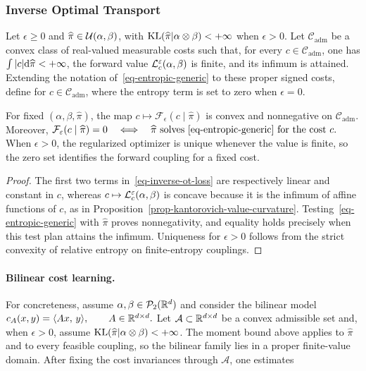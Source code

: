 \subsubsection{Inverse Optimal Transport}
\begin{defn}\label{def-inverse-ot-loss}
Let $\epsilon\geq0$ and $\widehat\pi\in\Couplings(\alpha,\beta)$, with $\KL(\widehat\pi|\alpha\otimes\beta)<+\infty$ when $\epsilon>0$. Let $\mathcal C_{\mathrm{adm}}$ be a convex class of real-valued measurable costs such that, for every $c\in\mathcal C_{\mathrm{adm}}$, one has $\int|c|\d\widehat\pi<+\infty$, the forward value $\MK_c^\epsilon(\alpha,\beta)$ is finite, and its infimum is attained. Extending the notation of~\eqref{eq-entropic-generic} to these proper signed costs, define
for $c\in\mathcal C_{\mathrm{adm}}$, where the entropy term is set to zero when $\epsilon=0$.
\end{defn}
\begin{prop}\label{prop-inverse-ot-convex}
For fixed $(\alpha,\beta,\widehat\pi)$, the map $c\mapsto\mathcal F_\epsilon(c\mid\widehat\pi)$ is convex and nonnegative on $\mathcal C_{\mathrm{adm}}$. Moreover,
\(\mathcal F_\epsilon(c\mid\widehat\pi)=0 \quad\Longleftrightarrow\quad \widehat\pi\text{ solves~\eqref{eq-entropic-generic} for the cost }c.\)
When $\epsilon>0$, the regularized optimizer is unique whenever the value is finite, so the zero set identifies the forward coupling for a fixed cost.
\end{prop}
\begin{proof}
The first two terms in~\eqref{eq-inverse-ot-loss} are respectively linear and constant in $c$, whereas $c\mapsto\MK_c^\epsilon(\alpha,\beta)$ is concave because it is the infimum of affine functions of $c$, as in Proposition~\ref{prop-kantorovich-value-curvature}. Testing~\eqref{eq-entropic-generic} with $\widehat\pi$ proves nonnegativity, and equality holds precisely when this test plan attains the infimum. Uniqueness for $\epsilon>0$ follows from the strict convexity of relative entropy on finite-entropy couplings.
\end{proof}
\paragraph{Bilinear cost learning.}
For concreteness, assume $\alpha,\beta\in\Pp_2(\RR^d)$ and consider the bilinear model
\(c_A(x,y)=\dotp{Ax}{y}, \qquad A\in\RR^{d\times d}.\)
Let $\mathcal A\subset\RR^{d\times d}$ be a convex admissible set and, when $\epsilon>0$, assume $\KL(\widehat\pi|\alpha\otimes\beta)<+\infty$. The moment bound above applies to $\widehat\pi$ and to every feasible coupling, so the bilinear family lies in a proper finite-value domain. After fixing the cost invariances through $\mathcal A$, one estimates
